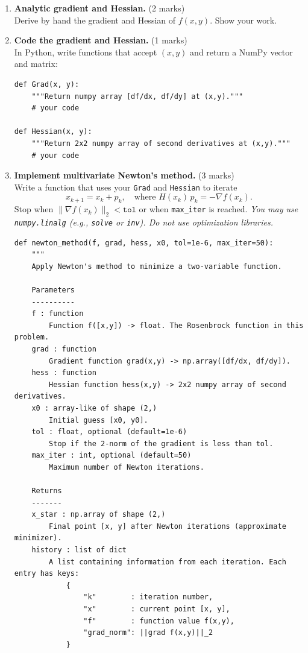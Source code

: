 \documentclass[11pt]{article}
\begin{document}
\begin{enumerate}
  \item \textbf{ Analytic gradient and Hessian.} (2 marks)\\
  Derive by hand the gradient and Hessian of $f(x,y)$. Show your work.

  \item \textbf{ Code the gradient and Hessian.} (1 marks)\\
  In Python, write functions that accept $(x,y)$ and return a NumPy vector and matrix:
\begin{verbatim}
def Grad(x, y):
    """Return numpy array [df/dx, df/dy] at (x,y)."""
    # your code

def Hessian(x, y):
    """Return 2x2 numpy array of second derivatives at (x,y)."""
    # your code
\end{verbatim}

  \item \textbf{ Implement multivariate Newton's method.} (3 marks)\\
  Write a function that uses your \texttt{Grad} and \texttt{Hessian} to iterate
  \[
    x_{k+1} = x_k + p_k, \quad \text{where } H(x_k)\,p_k = -\nabla f(x_k).
  \]
  Stop when $\|\nabla f(x_k)\|_2 < \texttt{tol}$ or when \texttt{max\_iter} is reached. 
  \emph{You may use \texttt{numpy.linalg} (e.g., \texttt{solve} or \texttt{inv}). Do not use optimization libraries.}
\newpage
\begin{verbatim}
def newton_method(f, grad, hess, x0, tol=1e-6, max_iter=50):
    """
    Apply Newton's method to minimize a two-variable function.

    Parameters
    ----------
    f : function
        Function f([x,y]) -> float. The Rosenbrock function in this problem.
    grad : function
        Gradient function grad(x,y) -> np.array([df/dx, df/dy]).
    hess : function
        Hessian function hess(x,y) -> 2x2 numpy array of second derivatives.
    x0 : array-like of shape (2,)
        Initial guess [x0, y0].
    tol : float, optional (default=1e-6)
        Stop if the 2-norm of the gradient is less than tol.
    max_iter : int, optional (default=50)
        Maximum number of Newton iterations.

    Returns
    -------
    x_star : np.array of shape (2,)
        Final point [x, y] after Newton iterations (approximate minimizer).
    history : list of dict
        A list containing information from each iteration. Each entry has keys:
            {
                "k"        : iteration number,
                "x"        : current point [x, y],
                "f"        : function value f(x,y),
                "grad_norm": ||grad f(x,y)||_2
            }


\end{verbatim}
\end{enumerate}
\end{document}
